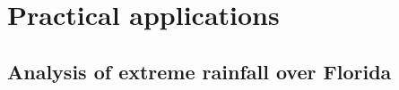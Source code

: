 \documentclass[12pt]{article}
\begin{document}
\section{Practical applications}
\label{sec:real}

\subsection{Analysis of extreme rainfall over Florida}
\label{ssec:florida}
\end{document}
